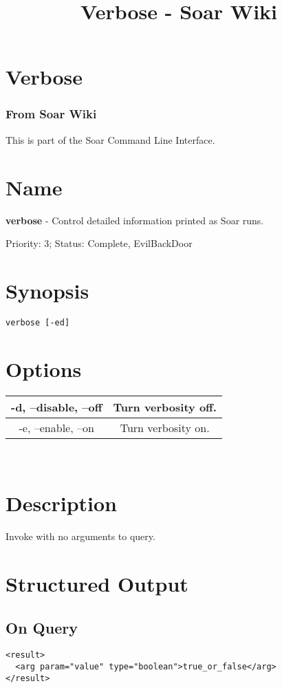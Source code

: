 \documentclass[10pt]{article}
\title{Verbose - Soar Wiki}
\begin{document}
\section*{Verbose}
\subsubsection*{From Soar Wiki}


 This is part of the Soar Command Line Interface. 
\section*{ Name }


 \textbf{verbose}
 - Control detailed information printed as Soar runs. 


 Priority: 3; Status: Complete, EvilBackDoor
\section*{ Synopsis }
\begin{verbatim}
verbose [-ed]

\end{verbatim}
\section*{ Options }


\begin{tabular}{|c|c|}
\hline 
 -d, --disable, --off  & Turn verbosity off.  \\
 \hline 
 -e, --enable, --on  & Turn verbosity on.  \\
 \hline 

\end{tabular}



 \\ 

\section*{ Description }


 Invoke with no arguments to query. 
\section*{ Structured Output }
\subsection*{ On Query }
\begin{verbatim}
<result>
  <arg param="value" type="boolean">true_or_false</arg>
</result>

\end{verbatim}
\end{document}
